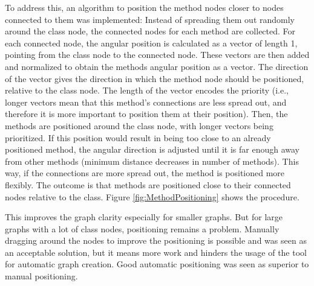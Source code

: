 \documentclass[a4paper,11pt,twoside]{article}
\theoremstyle{definition} %
\begin{document}
To address this, an algorithm to position the method nodes closer to nodes connected to them was implemented: Instead of spreading them out randomly around the class node, the connected nodes for each method are collected. For each connected node, the angular position is calculated as a vector of length 1, pointing from the class node to the connected node. These vectors are then added and normalized to obtain the methods angular position as a vector. The direction of the vector gives the direction in which the method node should be positioned, relative to the class node. The length of the vector encodes the priority (i.e., longer vectors mean that this method's connections are less spread out, and therefore it is more important to position them at their position). Then, the methods are positioned around the class node, with longer vectors being prioritized. If this position would result in being too close to an already positioned method, the angular direction is adjusted until it is far enough away from other methods (minimum distance decreases in number of methods). This way, if the connections are more spread out, the method is positioned more flexibly. The outcome is that methods are positioned close to their connected nodes relative to the class. Figure \ref{fig:MethodPositioning} shows the procedure.

This improves the graph clarity especially for smaller graphs. But for large graphs with a lot of class nodes, positioning remains a problem. Manually dragging around the nodes to improve the positioning is possible and was seen as an acceptable solution, but it means more work and hinders the usage of the tool for automatic graph creation. Good automatic positioning was seen as superior to manual positioning.
\end{document}
